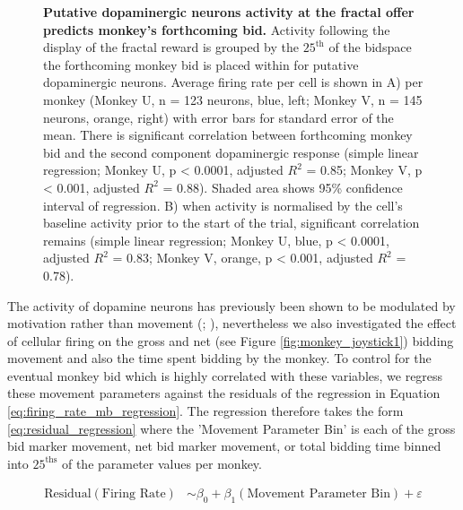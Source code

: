 \begin{figure}[htbp!] 
\centering    

\caption[Putative dopaminergic neurons activity at the fractal offer predicts monkey's forthcoming bid.]{\textbf{Putative dopaminergic neurons activity at the fractal offer predicts monkey's forthcoming bid.} Activity following the display of the fractal reward is grouped by the $25^{\text{th}}$ of the bidspace the forthcoming monkey bid is placed within for putative dopaminergic neurons. Average firing rate per cell is shown in A) per monkey (Monkey U, n = 123 neurons, blue, left; Monkey V, n = 145 neurons, orange, right) with error bars for standard error of the mean. There is significant correlation between forthcoming monkey bid and the second component dopaminergic response (simple linear regression; Monkey U, p < 0.0001, adjusted  $R^2$ = 0.85; Monkey V, p < 0.001, adjusted $R^2$ = 0.88). Shaded area shows 95\% confidence interval of regression. B) when activity is normalised by the cell's baseline activity prior to the start of the trial, significant correlation remains (simple linear regression; Monkey U, blue, p < 0.0001, adjusted $R^2$ = 0.83; Monkey V, orange, p < 0.001, adjusted $R^2$ = 0.78).}
\label{fig:fractal_display_regression}
\end{figure}

The activity of dopamine neurons has previously been shown to be modulated by motivation rather than movement (\cite{ljungbergResponsesMonkeyDopamine1992}; \cite{satohCorrelatedCodingMotivation2003}), nevertheless we also investigated the effect of cellular firing on the gross and net (see Figure \ref{fig:monkey_joystick1}) bidding movement and also the time spent bidding by the monkey. To control for the eventual monkey bid which is highly correlated with these variables, we regress these movement parameters against the residuals of the regression in Equation \ref{eq:firing_rate_mb_regression}. The regression therefore takes the form \ref{eq:residual_regression} where the 'Movement Parameter Bin' is each of the gross bid marker movement, net bid marker movement, or total bidding time binned into $25^{\text{ths}}$ of the parameter values per monkey.

\begin{align}
\text{Residual}(\text{Firing Rate}) &\sim \beta_0 + \beta_1(\text{Movement Parameter Bin}) + \varepsilon \label{eq:residual_regression}
\end{align}

